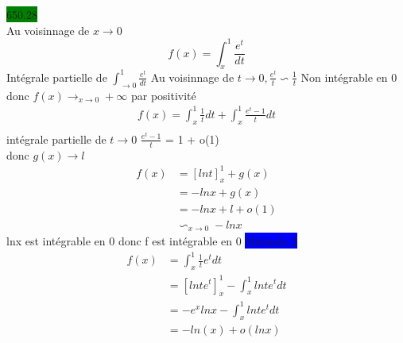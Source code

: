 \documentclass{article}
\begin{document}
\noindent \colorbox{green}{650.28}\\
Au voisinnage de \(x \to 0\) \begin{equation*}
    f(x) = \int_{x}^{1}\frac{e^t}{dt}   
\end{equation*}
Intégrale partielle de \(\int_{\to 0}^{1}\frac{e^t}{dt}\)
Au voisinnage de \(t \rightarrow 0, \frac{e^{t}}{t} \backsim \frac{1}{t}\) Non intégrable en 0 donc \(f(x) \rightarrow_{x\to 0}+\infty\) par positivité \\ 
\begin{align*}
    f(x) = \int_{x}^{1} \frac{1}{t}dt + \int_{x}^{1} \frac{e^{t}-1}{t}dt \\ 
\end{align*}
intégrale partielle de \(t \rightarrow 0\) \(\frac{e^{t}-1}{t}\) = 1 + o(1) \\
donc \(g(x) \rightarrow l\)\\
\begin{align*}
  f(x) &= [lnt]^{1}_{x} + g(x)\\
       &= -lnx + g(x)\\
       &= -lnx + l + o(1)\\
       &\backsim_{x\to 0}-lnx 
\end{align*}
lnx est intégrable en 0 donc f est intégrable en 0 
\colorbox{blue}{Méthode 2}\\
\begin{align*}
  f(x) &= \int_{x}^{1} \frac{1}{t}e^{t} dt \\
       &= [lnt e^{t}]^{1}_{x} - \int_{x}^{1}lnt e^{t} dt \\
       &= -e^{x}lnx - \int_{x}^{1} lnt e^{t} dt \\
       &= -ln(x) + o(lnx)
\end{align*}
\end{document}
